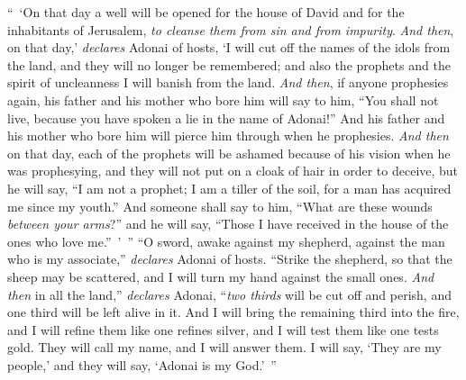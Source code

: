 \begin{biblechapter} %
\verse “ ‘On that day a well will be opened for the house of David and for the inhabitants of Jerusalem, \textit{to cleanse them from sin and from impurity}.
\verse \textit{And then}, on that day,’ \textit{declares} Adonai of hosts, ‘I will cut off the names of the idols from the land, and they will no longer be remembered; and also the prophets and the spirit of uncleanness I will banish from the land.
\verse \textit{And then}, if anyone prophesies again, his father and his mother who bore him will say to him, “You shall not live, because you have spoken a lie in the name of Adonai!” And his father and his mother who bore him will pierce him through when he prophesies.
\verse \textit{And then} on that day, each of the prophets will be ashamed because of his vision when he was prophesying, and they will not put on a cloak of hair in order to deceive,
\verse but he will say, “I am not a prophet; I am a tiller of the soil, for a man has acquired me since my youth.”
\verse And someone shall say to him, “What are these wounds \textit{between your arms}?” and he will say, “Those I have received in the house of the ones who love me.” ’ ”
 “O sword, awake against my shepherd, 
against the man who is my associate,” 
\textit{declares} Adonai of hosts. 
“Strike the shepherd, 
so that the sheep may be scattered, 
and I will turn my hand against the small ones.
\verse \textit{And then} in all the land,” \textit{declares} Adonai, 
“\textit{two thirds} will be cut off and perish, 
and one third will be left alive in it.
\verse And I will bring the remaining third into the fire, 
and I will refine them like one refines silver, 
and I will test them like one tests gold. 
They will call my name, 
and I will answer them. 
I will say, ‘They are my people,’ 
and they will say, ‘Adonai is my God.’ ”
\end{biblechapter}

